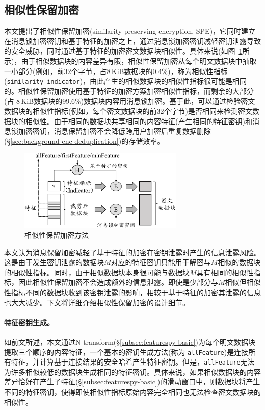 
\subsection{相似性保留加密}
\label{subsec:featurespy-spe}

本文提出了相似性保留加密(similarity-preserving
encryption, SPE)，它同时建立在消息锁加密密钥和基于特征的加密之上，通过消息锁加密密钥减轻密钥泄露导致的安全威胁，同时通过基于特征的加密密文数据块相似性。具体来说(如图~\ref{fig:featurespy-design-spe}所示)，由于相似数据块的内容差异有限，相似性保留加密从每个明文数据块中抽取一小部分(例如，前32个字节，占8\,KiB数据块的0.4\%)，称为相似性指标({\tt similarity indicator})，由此产生的相似数据块的相似性指标很可能是相同的。相似性保留加密使用基于特征的加密方案加密相似性指标，而剩余的大部分(占 8\,KiB数据块的99.6\%)数据块内容用消息锁加密。基于此，\sysnameF 可以通过检验密文数据块的相似性指标(例如，每个密文数据块的前32个字节)是否相同来检测密文数据块的相似性。由于相同的数据块共享相同的内容特征(产生相同的特征密钥)和消息锁加密密钥，消息保留加密不会降低跨用户加密后重复数据删除(\S\ref{sec:background-enc-deduplication})的存储效率。

\begin{figure}[!htb]
    \centering
    \includegraphics[width=0.7\textwidth]{pic/featurespy/spe.pdf}
    \caption{相似性保留加密方法}
    \label{fig:featurespy-design-spe}
\end{figure}

本文认为消息保留加密减轻了基于特征的加密在密钥泄露时产生的信息泄露风险。这是由于发生密钥泄露的数据块$M$对应的特征密钥只能用于解密与$M$相似的数据块的相似性指标。同时，由于相似数据块本身很可能与数据块$M$具有相同的相似性指标，因此相似性保留加密不会造成额外的信息泄露。即使是少部分与$M$相似但相似性指标不同的数据块收到该密钥泄露的影响，相较于基于特征的加密其泄露的信息也大大减少。下文将详细介绍相似性保留加密的设计细节。

\paragraph*{特征密钥生成。}
如前文所述，本文通过N-transform(\S\ref{subsec:featurespy-basic})为每个明文数据块提取三个顺序的内容特征，一个基本的密钥生成方法(称为 {\tt allFeature})是连接所有特征，并计算基于连接结果的安全哈希产生特征密钥。但是，{\tt allFeature}无法为许多相似较低的数据块生成相同的特征密钥。具体来说，如果相似数据块的内容差异恰好在产生子特征(\S\ref{subsec:featurespy-basic})的滑动窗口中，则数据块将产生不同的特征密钥，使得即使相似性指标原始内容完全相同也无法检查密文数据块的相似性。

